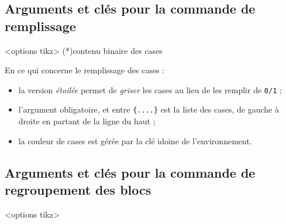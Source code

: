 \documentclass[french,a4paper,11pt]{article}
\begin{document}
\subsection{Arguments et clés pour la commande de remplissage}

\begin{DemoCode}
\begin{TableKarnaugh}[clés]<options tikz>
	\KarnaughCasesResult(*){contenu binaire des cases}
\end{TableKarnaugh}
\end{DemoCode}

\begin{tipblock}
En ce qui concerne le remplissage des cases :

\begin{itemize}
	\item la version \textit{étoilée} permet de \textit{griser} les cases au lieu de les remplir de \texttt{0/1} ;
	\item l'argument obligatoire, et entre \texttt{\{....\}} est la liste des cases, de gauche à droite en partant de la ligne du haut ;
	\item la couleur de cases est gérée par la clé idoine de l'environnement.
\end{itemize}
\vspace*{-\baselineskip}\leavevmode
\end{tipblock}

\subsection{Arguments et clés pour la commande de regroupement des blocs}

\begin{DemoCode}
\begin{TableKarnaugh}[clés]<options tikz>
\end{TableKarnaugh}
\end{DemoCode}
\end{document}
